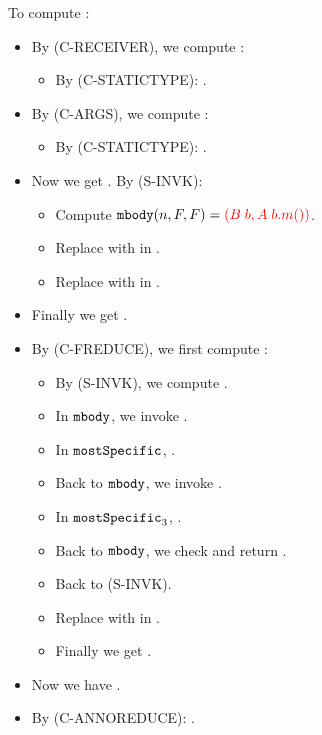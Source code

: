 To compute :
\begin{itemize}
	\item By (C-RECEIVER), we compute :
		\begin{itemize}
			\item By (C-STATICTYPE): .
		\end{itemize}
	\item By (C-ARGS), we compute :
		\begin{itemize}
			\item By (C-STATICTYPE): .
		\end{itemize}
	\item Now we get . By (S-INVK):
		\begin{itemize}
			\item Compute $\texttt{mbody}(n, F, F) = \textcolor{red}{(B \; b, A \; b.m())}$.
			\item Replace  with  in .
			\item Replace \red{$\kwthis$} with  in .
		\end{itemize}
	\item Finally we get .
	\item By (C-FREDUCE), we first compute :
		\begin{itemize}
			\item By (S-INVK), we compute .
			\item In $\texttt{mbody}$, we invoke .
			\item In $\texttt{mostSpecific}$, .
			\item Back to $\texttt{mbody}$, we invoke .
			\item In $\texttt{mostSpecific}_3$, .
			\item Back to $\texttt{mbody}$, we check  and return .
			\item Back to (S-INVK).
			\item Replace \red{$\kwthis$} with  in .
			\item Finally we get .
		\end{itemize}
	\item Now we have .
	\item By (C-ANNOREDUCE): .
\end{itemize}



